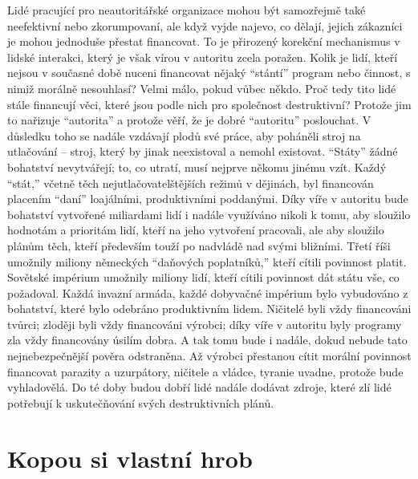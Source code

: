 \documentclass{book}
\begin{document}
Lidé pracující pro neautoritářské organizace mohou být samozřejmě také neefektivní nebo zkorumpovaní, ale když vyjde najevo, co dělají, jejich zákazníci je mohou jednoduše přestat financovat. To je přirozený korekční mechanismus v lidské interakci, který je však vírou v autoritu zcela poražen. Kolik je lidí, kteří nejsou v současné době nuceni financovat nějaký \enquote{stántí} program nebo činnost, s nimiž morálně nesouhlasí? Velmi málo, pokud vůbec někdo. Proč tedy tito lidé stále financují věci, které jsou podle nich pro společnost destruktivní? Protože jim to nařizuje \enquote{autorita} a protože věří, že je dobré \enquote{autoritu} poslouchat. V důsledku toho se nadále vzdávají plodů své práce, aby poháněli stroj na utlačování -- stroj, který by jinak neexistoval a nemohl existovat. \enquote{Státy} žádné bohatství nevytvářejí; to, co utratí, musí nejprve někomu jinému vzít. Každý \enquote{stát,} včetně těch nejutlačovatelštějších režimů v dějinách, byl financován placením \enquote{daní} loajálními, produktivními poddanými. Díky víře v autoritu bude bohatství vytvořené miliardami lidí i nadále využíváno nikoli k tomu, aby sloužilo hodnotám a prioritám lidí, kteří na jeho vytvoření pracovali, ale aby sloužilo plánům těch, kteří především touží po nadvládě nad svými bližními. Třetí říši umožnily miliony německých \enquote{daňových poplatníků,} kteří cítili povinnost platit. Sovětské impérium umožnily miliony lidí, kteří cítili povinnost dát státu vše, co požadoval. Každá invazní armáda, každé dobyvačné impérium bylo vybudováno z bohatství, které bylo odebráno produktivním lidem. Ničitelé byli vždy financováni tvůrci; zloději byli vždy financováni výrobci; díky víře v autoritu byly programy zla vždy financovány úsilím dobra. A tak tomu bude i nadále, dokud nebude tato nejnebezpečnější pověra odstraněna. Až výrobci přestanou cítit morální povinnost financovat parazity a uzurpátory, ničitele a vládce, tyranie uvadne, protože bude vyhladovělá. Do té doby budou dobří lidé nadále dodávat zdroje, které zlí lidé potřebují k uskutečňování svých destruktivních plánů.

\section{Kopou si vlastní hrob}
\end{document}
